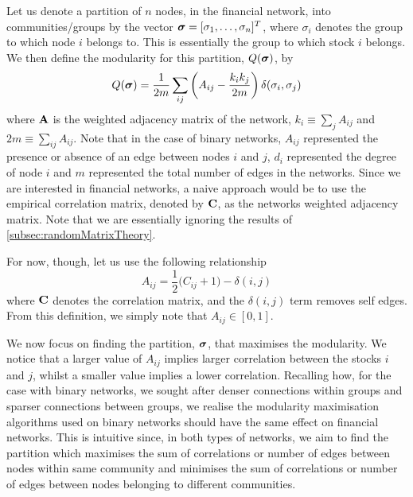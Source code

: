Let us denote a partition of $n$ nodes, in the financial network, into communities/groups by the vector $\vecvar{\sigma} = \transpose{[\sigma_{1},\dots,\sigma_{n}]}$, where $\sigma_{i}$ denotes the group to which node $i$ belongs to. This is essentially the group to which stock $i$ belongs. We then define the modularity for this partition, $Q(\vecvar{\sigma})$, by
\begin{equation}
\label{eq:modularityFinancialNetworks}
	Q(\vecvar{\sigma}) = \frac{1}{2m} \sum_{ij} \left(A_{ij} - \frac{k_{i}k_{j}}{2m} \right) \delta(\sigma_{i},\sigma_{j})
\end{equation}
where $\mathbf A$ is the weighted adjacency matrix of the network, $k_{i} \equiv \sum_{j} A_{ij}$ and $2m \equiv \sum_{ij} A_{ij}$.
Note that in the case of binary networks, $A_{ij}$ represented the presence or absence of an edge between nodes $i$ and $j$, $d_{i}$ represented the degree of node $i$ and $m$ represented the total number of edges in the networks.
Since we are interested in financial networks, a naive approach would be to use the empirical correlation matrix, denoted by $\mathbf C$, as the networks weighted adjacency matrix. Note that we are essentially ignoring the results of \cref{subsec:randomMatrixTheory}.

For now, though, let us use the following relationship
\begin{equation}
\label{eq:weightedAdjacencyMatrixFinancialNetworks}
	A_{ij} = \frac{1}{2} \big( C_{ij}+1 \big) - \delta(i,j)
\end{equation}
where $\mathbf C$ denotes the correlation matrix, and the $\delta(i,j)$ term removes self edges. From this definition, we simply note that $A_{ij} \in [0,1]$.

We now focus on finding the partition, $\vecvar{\sigma}$, that maximises the modularity. We notice that a larger value of $A_{ij}$ implies larger correlation between the stocks $i$ and $j$, whilst a smaller value implies a lower correlation.
 Recalling how, for the case with binary networks, we sought after denser connections within groups and sparser connections between groups, we realise the modularity maximisation algorithms used on binary networks should have the same effect on financial networks.
This is intuitive since, in both types of networks, we aim to find the partition which maximises the sum of correlations or number of edges between nodes within same community and minimises the sum of correlations or number of edges between nodes belonging to different communities.

